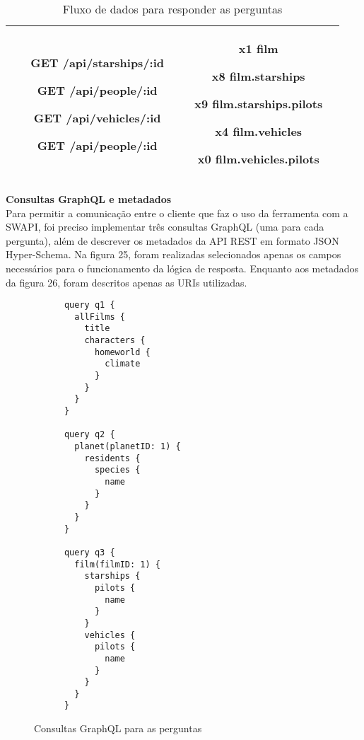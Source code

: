 \begin{table}[H]
\begin{tabular}{|c|c|c|}
\begin{minipage}[t]{0.3\textwidth}
\begin{itemize}
        \item[\textbf{GET}] /api/starships/:id
        \item[\textbf{GET}] /api/people/:id
        \item[\textbf{GET}] /api/vehicles/:id
        \item[\textbf{GET}] /api/people/:id
      \end{itemize}
    \end{minipage} & \begin{minipage}[t]{0.5\textwidth}
      \begin{itemize}
        \item[\textbf{x1}] film
        \item[\textbf{x8}] film.starships
        \item[\textbf{x9}] film.starships.pilots
        \item[\textbf{x4}] film.vehicles
        \item[\textbf{x0}] film.vehicles.pilots
      \end{itemize}
    \end{minipage} \\
    \hline
  \end{tabular}
  \caption{Fluxo de dados para responder as perguntas}
\end{table}

\textbf{Consultas GraphQL e metadados} \\

Para permitir a comunicação entre o cliente que faz o uso da ferramenta com a SWAPI, foi preciso implementar três consultas GraphQL (uma para cada pergunta), além de descrever os metadados da API REST em formato JSON Hyper-Schema. Na figura 25, foram realizadas selecionados apenas os campos necessários para o funcionamento da lógica de resposta. Enquanto aos metadados da figura 26, foram descritos apenas as URIs utilizadas.

\begin{figure}[H]
  \centering
  \begin{verbatim}
      query q1 {
        allFilms {
          title
          characters {
            homeworld {
              climate
            }
          }
        }
      }

      query q2 {
        planet(planetID: 1) {
          residents {
            species {
              name
            }
          }
        }
      }

      query q3 {
        film(filmID: 1) {
          starships {
            pilots {
              name
            }
          }
          vehicles {
            pilots {
              name
            }
          }
        }
      }
  \end{verbatim}
  \caption{Consultas GraphQL para as perguntas}
\end{figure}

